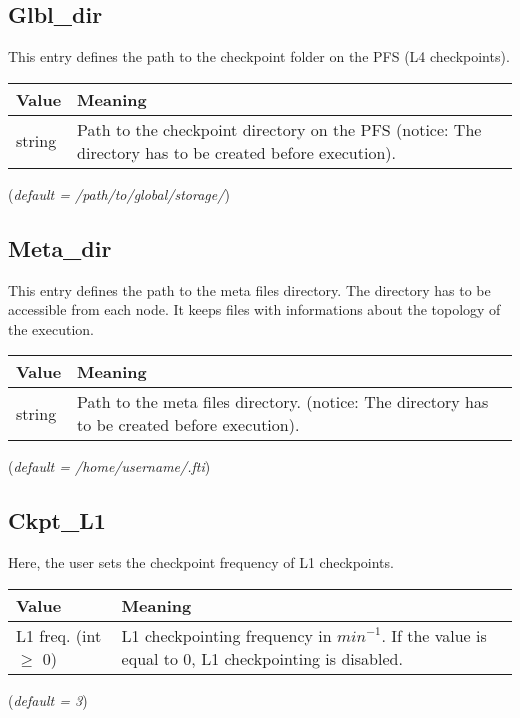 \documentclass{refrep}
\begin{document}
\subsection{Glbl\_dir}\label{subsec:glbldir}
This entry defines the path to the checkpoint folder on the PFS (L4 checkpoints).
\begin{center}
\begin{tabular}[h!]{|p{}|p{}|}
\hline
\textbf{Value} & \textbf{Meaning} \\ \hline
string & Path to the checkpoint directory on the PFS (notice: The directory has to be created before execution). \\ \hline
\end{tabular}
\end{center}
(\textit{default = /path/to/global/storage/})
\subsection{Meta\_dir}\label{subsec:metadir}
This entry defines the path to the meta files directory. The directory has to be accessible from each node. It keeps files with informations about the topology of the execution.
\begin{center}
\begin{tabular}[h!]{|p{}|p{}|}
\hline
\textbf{Value} & \textbf{Meaning} \\ \hline
string & Path to the meta files directory. (notice: The directory has to be created before execution). \\ \hline
\end{tabular}
\end{center}
(\textit{default = /home/username/.fti})
\subsection{Ckpt\_L1}\label{subsec:ckptl1}
Here, the user sets the checkpoint frequency of L1 checkpoints.
\begin{center}
\begin{tabular}[h!]{|p{}|p{}|}
\hline
\textbf{Value} & \textbf{Meaning} \\ \hline
L1 freq. (int $\geq$ 0)  & L1 checkpointing frequency in $\textit{min}^{-1}$. If the value is equal to 0, L1 checkpointing is disabled.  \\ \hline
\end{tabular}
\end{center}
(\textit{default = 3})
\end{document}

